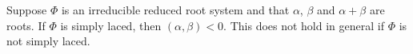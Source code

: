 Suppose $\Phi$ is an irreducible reduced root system and that $\alpha$, $\beta$
and $\alpha + \beta$ are roots. If $\Phi$ is simply laced, then $(\alpha, \beta) < 0$.
This does not hold in general if $\Phi$ is not simply laced.
